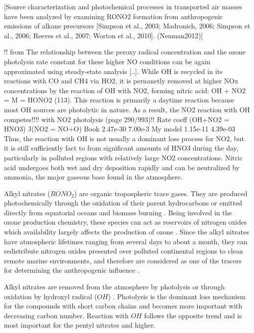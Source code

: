 \documentclass[11pt,a4paper]{article}
\begin{document}
[Source characterization and photochemical processes in
transported air masses have been analyzed by examining
RONO2 formation from anthropogenic emissions of alkane
precursors [Simpson et al., 2003; Madronich, 2006; Simpson
et al., 2006; Reeves et al., 2007; Worton et al., 2010]. (Neuman2012)]

!! from \citep{Finlayson-Pitts2000}
The relationship between the peroxy radical concentration and the ozone photolysis rate constant for these higher NO conditions can be again approximated using steady-state analysis [..]. While OH is recycled in its reactions with CO and CH4 via HO2, it is pernanetly removed at higher NOx concentrations by the reaction of OH with NO2, forming nitric acid:
OH + NO2 = M = HONO2 (113).
This reaction is primarily a daytime reaction because most OH sources are photolytic in nature. As a result, the NO2 reaction with OH competes!!!! with NO2 photolysis (page 290/993)!!
         Rate coeff (OH+NO2 = HNO3)  J(NO2 = NO+O)
Book     2.47e-30          7.00e-3
My model 1.15e-11          4.39e-03
Thus, the reaction with OH is not usually a dominant loss process for NO2, but it is still sufficiently fact to from significant amounts of HNO3 during the day, particularly in polluted regions with relatively large NO2 concentrations.
Nitric acid undergoes both wet and dry deposition rapidly and can be neutralized by ammonia, the major gaseous base found in the atmosphere.

Alkyl nitrates ($RONO_2$) are organic tropospheric trace gases. They are produced photochemically through the oxidation of their parent hydrocarbons \citep{Roberts1990} or emitted directly from equatorial oceans \citep{Blake2003} and biomass burning \citep{Simpson2002}. Being involved in the ozone production chemistry, these species can act as reservoirs of nitrogen oxides which availability largely affects the production of ozone \citep{Reeves2007}. Since the alkyl nitrates have atmospheric lifetimes ranging from several days to about a month, they can redistribute nitrogen oxides presented over polluted continental regions to clean remote marine environments, and therefore are considered as one of the tracers for determining the anthropogenic influence \citep{Atherton1989, Reeves2007, Worton2005}.

Alkyl nitrates are removed from the atmosphere by photolysis \citep{Turberg1990} or through oxidation by hydroxyl radical ($OH$) \citep{Talukdar1997}. Photolysis is the dominant loss mechanism for the compounds with short carbon chains and becomes more important with decreasing carbon number. Reaction with $OH$ follows the opposite trend and is most important for the pentyl nitrates and higher.
\end{document}

